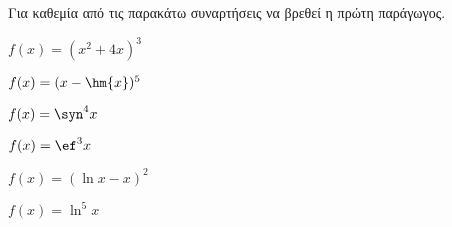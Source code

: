 Για καθεμία από τις παρακάτω συναρτήσεις να βρεθεί η πρώτη παράγωγος.
\begin{multicols}{2}
\begin{alist}
\item $ f(x)=(x^2+4x)^3 $
\item $ f(x)=(x-\hm{x})^5 $
\item $ f(x)=\syn^4{x} $
\item $ f(x)=\ef^3{x} $
\item $ f(x)=(\ln{x}-x)^2 $
\item $ f(x)=\ln^5{x} $
\end{alist}
\end{multicols}
